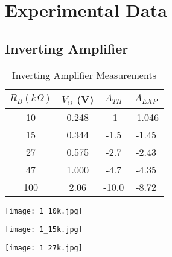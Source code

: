 \documentclass{article}
\begin{document}
\section{Experimental Data}

\subsection{Inverting Amplifier}

\begin{table}[!h]\LARGE
    \begin{center}
        \begin{tabular}{|c||c|c|c|} \hline
            $R_{B} (k\Omega)$ & $V_{O}$ (V) & $A_{TH}$ & $A_{EXP}$\\ \hline
            10 & 0.248 & -1 & -1.046 \\ \hline
            15 & 0.344 & -1.5 & -1.45\\ \hline
            27 & 0.575 & -2.7 & -2.43\\ \hline
            47 & 1.000 & -4.7 & -4.35\\ \hline
            100 & 2.06 & -10.0 & -8.72\\ \hline
        \end{tabular}
        \caption{Inverting Amplifier Measurements}
        \label{invertchart}
    \end{center}
\end{table}
\vspace{10pt}

\begin{center}
\texttt{[image: 1\_10k.jpg]}
\label{10kinvert}
\end{center}
\vspace{10pt}

\begin{center}
\texttt{[image: 1\_15k.jpg]}
\label{15kinvert}
\end{center}
\vspace{10pt}

\begin{center}
\texttt{[image: 1\_27k.jpg]}
\label{27kinvert}
\end{center}
\vspace{10pt}
\end{document}
